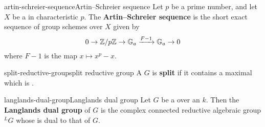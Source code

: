 \begin{topic}{artin-schreier-sequence}{Artin--Schreier sequence}
    Let $p$ be a prime number, and let $X$ be a  in characteristic $p$. The \textbf{Artin--Schreier sequence} is the short exact sequence of group schemes over $X$ given by
    \[ 0 \to \mathbb{Z}/p\mathbb{Z} \to \mathbb{G}_a \xrightarrow{F - 1} \mathbb{G}_a \to 0 \]
    where $F - 1$ is the map $x \mapsto x^p - x$.
\end{topic}

\begin{topic}{split-reductive-group}{split reductive group}
    A  $G$ is \textbf{split} if it contains a maximal  which is .
\end{topic}

\begin{topic}{langlands-dual-group}{Langlands dual group}
    Let $G$ be a    over an  $k$. Then the \textbf{Langlands dual group} of $G$ is the complex connected reductive algebraic group $^L G$ whose  is dual to that of $G$.
\end{topic}

